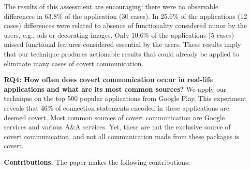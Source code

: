 The results of this  assessment are encouraging: there were no observable differences in 63.8\% of the application (30 cases). In 25.6\% of the applications (12 cases) differences were related to absence of functionality considered minor by the users, e.g., ads or decorating images. Only 10.6\% of the applications (5 cases) missed functional features considered essential by the users. 
These results imply that our technique produces actionable results that could already be applied to eliminate many cases of covert communication. 


\noindent 
{\bf RQ4: How often does covert communication occur in real-life applications and what are its most common sources?}
We apply our technique on the top 500 popular applications from Google Play. This experiment reveals that 46\% of connection statements encoded in these applications 
are deemed covert.
Most common sources of covert communication are Google services %
and various A\&A services. Yet, these are not the exclusive source of covert communication, and not all communication made from these packages is covert. 

%

\noindent 
{\bf Contributions.}
The paper makes the following contributions:

